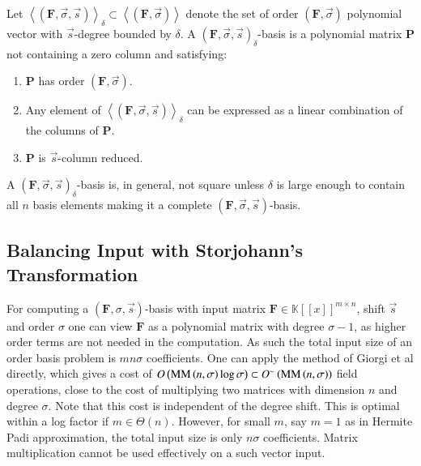 \begin{defn}
\label{def:genset} Let $\left\langle \left(\mathbf{F},\vec{\sigma},\vec{s}\right)\right\rangle _{\delta}\subset\left\langle \left(\mathbf{F},\vec{\sigma}\right)\right\rangle $
denote the set of order $\left(\mathbf{F},\vec{\sigma}\right)$ polynomial
vector with $\vec{s}$-degree bounded by $\delta$. A $\left(\mathbf{F},\vec{\sigma},\vec{s}\right)_{\delta}$-basis
is a polynomial matrix $\mathbf{P}$ not containing a zero column
and satisfying: 
\begin{enumerate}
\item $\mathbf{P}$ has order $\left(\mathbf{F},\vec{\sigma}\right).$ 
\item Any element of $\left\langle \left(\mathbf{F},\vec{\sigma},\vec{s}\right)\right\rangle _{\delta}$
can be expressed as a linear combination of the columns of $\mathbf{P}$. 
\item $\mathbf{P}$ is $\vec{s}$-column reduced. 
\end{enumerate}
\end{defn}
%
\begin{comment}
As before, the linear combination here is in fact unique. 
\end{comment}
{}A $\left(\mathbf{F},\vec{\sigma},\vec{s}\right)_{\delta}$-basis is,
in general, not square unless $\delta$ is large enough to contain
all $n$ basis elements making it a complete $\left(\mathbf{F},\vec{\sigma},\vec{s}\right)$-basis.


\subsection{Balancing Input with Storjohann's Transformation}

\label{sub:storjohannTransformation}

For computing a $\left(\mathbf{F},\sigma,\vec{s}\right)$-basis with
input matrix $\mathbf{F}\in\mathbb{K}\left[\left[x\right]\right]^{m\times n}$,
shift $\vec{s}$ and order $\sigma$ one can view $\mathbf{F}$ as
a polynomial matrix with degree $\sigma-1$, as higher order terms
are not needed in the computation. As such the total input size of
an order basis problem is $mn\sigma$ coefficients. One can apply
the method of Giorgi et al \citeyearpar{Giorgi2003} directly, which
gives a cost of $O\left(\MM\left(n,\sigma\right)\log\sigma\right)\subset O^{\sim}\left(\MM\left(n,\sigma\right)\right)$
field operations, close to the cost of multiplying two matrices with
dimension $n$ and degree $\sigma$. Note that this cost is independent
of the degree shift. This is optimal within a log factor if $m\in\Theta\left(n\right)$.
However, for small $m$, say $m=1$ as in Hermite Padi approximation,
the total input size is only $n\sigma$ coefficients. Matrix multiplication
cannot be used effectively on a such vector input.

